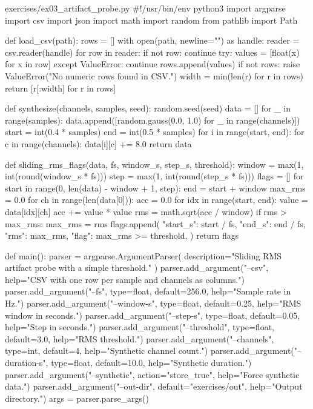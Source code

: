 \documentclass[11pt,openany]{book}
\begin{document}
\begin{filecontents*}{exercises/ex03_artifact_probe.py}
#!/usr/bin/env python3
import argparse
import csv
import json
import math
import random
from pathlib import Path


def load_csv(path):
    rows = []
    with open(path, newline="") as handle:
        reader = csv.reader(handle)
        for row in reader:
            if not row:
                continue
            try:
                values = [float(x) for x in row]
            except ValueError:
                continue
            rows.append(values)
    if not rows:
        raise ValueError("No numeric rows found in CSV.")
    width = min(len(r) for r in rows)
    return [r[:width] for r in rows]


def synthesize(channels, samples, seed):
    random.seed(seed)
    data = []
    for _ in range(samples):
        data.append([random.gauss(0.0, 1.0) for _ in range(channels)])
    start = int(0.4 * samples)
    end = int(0.5 * samples)
    for i in range(start, end):
        for c in range(channels):
            data[i][c] += 8.0
    return data


def sliding_rms_flags(data, fs, window_s, step_s, threshold):
    window = max(1, int(round(window_s * fs)))
    step = max(1, int(round(step_s * fs)))
    flags = []
    for start in range(0, len(data) - window + 1, step):
        end = start + window
        max_rms = 0.0
        for ch in range(len(data[0])):
            acc = 0.0
            for idx in range(start, end):
                value = data[idx][ch]
                acc += value * value
            rms = math.sqrt(acc / window)
            if rms > max_rms:
                max_rms = rms
        flags.append(
            {
                "start_s": start / fs,
                "end_s": end / fs,
                "rms": max_rms,
                "flag": max_rms >= threshold,
            }
        )
    return flags


def main():
    parser = argparse.ArgumentParser(
        description="Sliding RMS artifact probe with a simple threshold."
    )
    parser.add_argument("--csv", help="CSV with one row per sample and channels as columns.")
    parser.add_argument("--fs", type=float, default=256.0, help="Sample rate in Hz.")
    parser.add_argument("--window-s", type=float, default=0.25, help="RMS window in seconds.")
    parser.add_argument("--step-s", type=float, default=0.05, help="Step in seconds.")
    parser.add_argument("--threshold", type=float, default=3.0, help="RMS threshold.")
    parser.add_argument("--channels", type=int, default=4, help="Synthetic channel count.")
    parser.add_argument("--duration-s", type=float, default=10.0, help="Synthetic duration.")
    parser.add_argument("--synthetic", action="store_true", help="Force synthetic data.")
    parser.add_argument("--out-dir", default="exercises/out", help="Output directory.")
    args = parser.parse_args()


\end{filecontents*}
\end{document}
